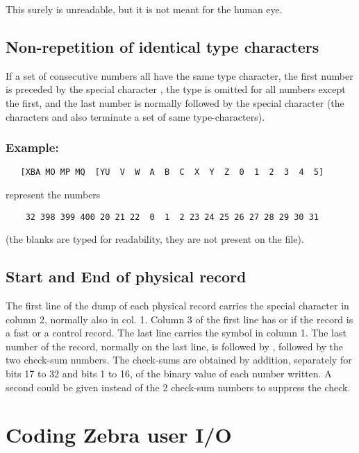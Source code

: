 This surely is unreadable, but it is not meant for the human eye.

\subsection*{Non-repetition of identical type characters}

If a set of consecutive numbers all have the same type character,
the first number is preceded by the special character \Lit{'['},
the type is omitted for all numbers except the first,
and the last number is normally followed by the special character \Lit{']'}
(the characters \Lit{'['} and  also terminate a set of
same type-characters).

\subsubsection*{Example:}

\begin{verbatim}
   [XBA MO MP MQ  [YU  V  W  A  B  C  X  Y  Z  0  1  2  3  4  5]
\end{verbatim}

represent the numbers

\begin{verbatim}
    32 398 399 400 20 21 22  0  1  2 23 24 25 26 27 28 29 30 31
\end{verbatim}

(the blanks are typed for readability, they are not present on the file).

\subsection*{Start and End of physical record}

The first line of the dump of each physical record carries the
special character  in column 2, normally also in col. 1.
Column 3 of the first line has  or  if the record is a
fast or a control record.
The last line carries the symbol  in column 1.
The last number of the record, normally on the last line,
is followed by , followed by the two check-sum numbers.
The check-sums are obtained by addition,
separately for bits 17 to 32 and bits 1 to 16,
of the binary value of each number written.
A second  could be given instead of the 2 check-sum numbers
to suppress the check.

\section{Coding Zebra user I/O}

